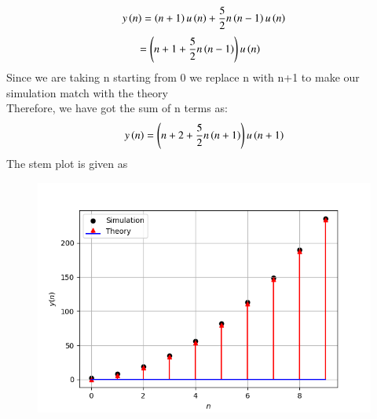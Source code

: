 \documentclass[journal,12pt,twocolumn]{IEEEtran}
\theoremstyle{remark}
\begin{document}
\begin{align}
y\brak{n} = \brak{n+1 }u\brak{n} + \frac{5}{2} n\brak{n-1} u\brak{n}
\end{align}
\begin{align}
&= \brak{n+1 + \frac{5}{2} n\brak{n-1}}u\brak{n}
\end{align}
Since we are taking n starting from 0 we replace n with n+1 to make our simulation match with the theory\\Therefore, we have got the sum of n terms as:\\
\begin{align}
y\brak{n}= \brak{n+2 + \frac{5}{2} n\brak{n+1}}u\brak{n+1}
\end{align}
The stem plot is given as
\begin{figure}[h!]
  \centering
  \includegraphics[width=\columnwidth]{ncert-maths/11/9/2/7/figs/Figure_1.png}
  \label{fig:Spash}
\end{figure}
\end{document}

